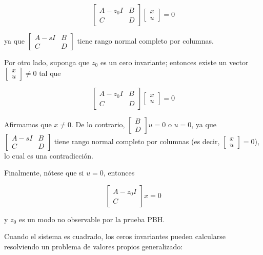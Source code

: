 $$
\left[\begin{array}{cc}
A-z_{0} I & B \\
C & D
\end{array}\right]\left[\begin{array}{l}
x \\
u
\end{array}\right]=0
$$

ya que $\left[\begin{array}{cc}A-s I & B \\ C & D\end{array}\right]$ tiene rango normal completo por columnas.

Por otro lado, suponga que $z_{0}$ es un cero invariante; entonces existe un vector $\left[\begin{array}{l}x \\ u\end{array}\right] \neq 0$ tal que

$$
\left[\begin{array}{cc}
A-z_{0} I & B \\
C & D
\end{array}\right]\left[\begin{array}{l}
x \\
u
\end{array}\right]=0
$$

Afirmamos que $x \neq 0$. De lo contrario, $\left[\begin{array}{l}B \\ D\end{array}\right] u=0$ o $u=0$, ya que $\left[\begin{array}{cc}A-s I & B \\ C & D\end{array}\right]$ tiene rango normal completo por columnas (es decir, $\left[\begin{array}{l}x \\ u\end{array}\right]=0$), lo cual es una contradicción.

Finalmente, nótese que si $u=0$, entonces

$$
\left[\begin{array}{c}
A-z_{0} I \\
C
\end{array}\right] x=0
$$

y $z_{0}$ es un modo no observable por la prueba PBH.

Cuando el sistema es cuadrado, los ceros invariantes pueden calcularse resolviendo un problema de valores propios generalizado:

